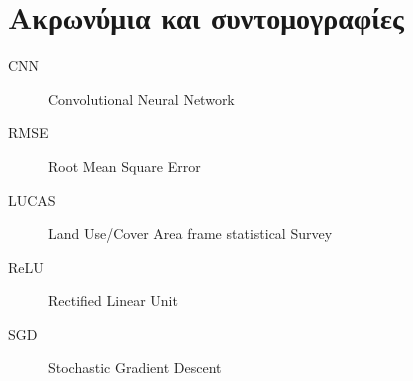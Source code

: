 \chapter{Ακρωνύμια και συντομογραφίες}

\begin{description}
    \item[CNN] Convolutional Neural Network
    \item[RMSE] Root Mean Square Error
    \item[LUCAS] Land Use/Cover Area frame statistical Survey
    \item[ReLU] Rectified Linear Unit
    \item[SGD] Stochastic Gradient Descent
    \item[] 
\end{description}
